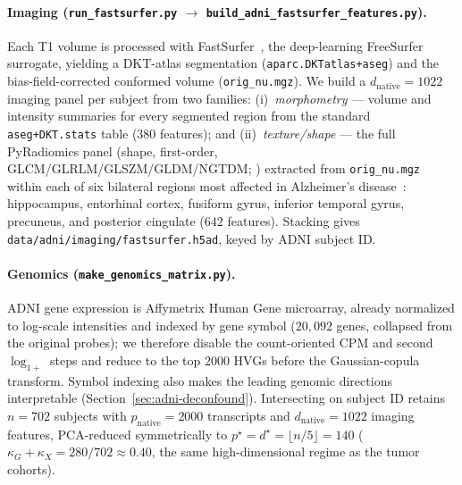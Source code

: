 \documentclass{article}
\begin{document}
\paragraph{Imaging
(\texttt{run\_fastsurfer.py} $\to$ \texttt{build\_adni\_fastsurfer\_features.py}).}
Each T1 volume is processed with
FastSurfer~\citep{henschel2020fastsurfer}, the deep-learning FreeSurfer
surrogate, yielding a DKT-atlas segmentation (\texttt{aparc.DKTatlas+aseg}) and
the bias-field-corrected conformed volume (\texttt{orig\_nu.mgz}). We build a
$d_{\mathrm{native}} = 1022$ imaging panel per subject from two families:
(i)~\emph{morphometry} --- volume and intensity summaries for every segmented
region from the standard \texttt{aseg+DKT.stats} table ($380$ features); and
(ii)~\emph{texture/shape} --- the full PyRadiomics panel
(shape, first-order, GLCM/GLRLM/GLSZM/GLDM/NGTDM;
\citealp{vangriethuysen2017pyradiomics}) extracted from \texttt{orig\_nu.mgz}
within each of six bilateral regions most affected in Alzheimer's
disease~\citep{braak1991staging}: hippocampus, entorhinal cortex, fusiform
gyrus, inferior temporal gyrus, precuneus, and posterior cingulate
($642$ features). Stacking gives
\texttt{data/adni/imaging/fastsurfer.h5ad}, keyed by ADNI subject ID.

\paragraph{Genomics (\texttt{make\_genomics\_matrix.py}).}
ADNI gene expression is Affymetrix Human Gene microarray, already normalized to
log-scale intensities and indexed by gene symbol ($20{,}092$ genes, collapsed
from the original probes); we therefore disable the count-oriented CPM and second
$\log_{1+}$ steps and reduce to the top $2000$ HVGs before the Gaussian-copula
transform. Symbol indexing also makes the leading genomic directions
interpretable (Section~\ref{sec:adni-deconfound}). Intersecting on subject ID
retains $n = 702$ subjects with
$p_{\mathrm{native}} = 2000$ transcripts and $d_{\mathrm{native}} = 1022$
imaging features, PCA-reduced symmetrically to
$p^\star = d^\star = \lfloor n/5 \rfloor = 140$
($\kappa_G + \kappa_X = 280/702 \approx 0.40$, the same high-dimensional regime
as the tumor cohorts).
\end{document}
